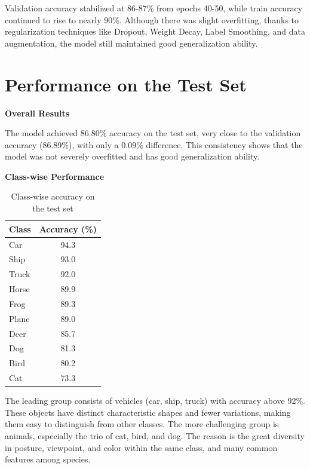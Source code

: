 \documentclass[12pt, a4paper, openany]{report}
\begin{document}
 Validation accuracy stabilized at 86-87\% from epochs 40-50, while train accuracy continued to rise to nearly 90\%. Although there was slight overfitting, thanks to regularization techniques like Dropout, Weight Decay, Label Smoothing, and data augmentation, the model still maintained good generalization ability.

 \section{Performance on the Test Set} %
 \textbf{Overall Results} %

 The model achieved 86.80\% accuracy on the test set, very close to the validation accuracy (86.89\%), with only a 0.09\% difference. This consistency shows that the model was not severely overfitted and has good generalization ability.

 \textbf{Class-wise Performance} %
 \begin{table}[H]
     \centering
     \caption{Class-wise accuracy on the test set} %
     \begin{tabular}{lc}
         \toprule
         \textbf{Class} & \textbf{Accuracy (\%)} \\ %
         \midrule
         Car & 94.3 \\
         Ship & 93.0 \\
         Truck & 92.0 \\
         Horse & 89.9 \\
         Frog & 89.3 \\
         Plane & 89.0 \\
         Deer & 85.7 \\
         Dog & 81.3 \\
         Bird & 80.2 \\
         Cat & 73.3 \\
         \bottomrule
     \end{tabular}
     \label{tab:class_accuracy}
 \end{table}
 The leading group consists of vehicles (car, ship, truck) with accuracy above 92\%. These objects have distinct characteristic shapes and fewer variations, making them easy to distinguish from other classes. The more challenging group is animals, especially the trio of cat, bird, and dog. The reason is the great diversity in posture, viewpoint, and color within the same class, and many common features among species.
\end{document}
